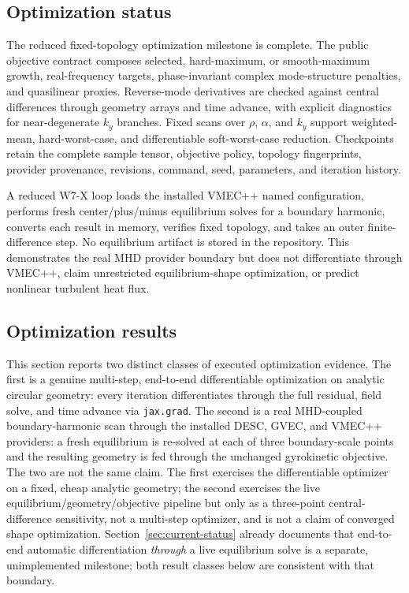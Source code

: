 \documentclass[11pt,a4paper]{article}
\begin{document}
\subsection{Optimization status}

The reduced fixed-topology optimization milestone is complete.  The public
objective contract composes selected, hard-maximum, or smooth-maximum growth,
real-frequency targets, phase-invariant complex mode-structure penalties, and
quasilinear proxies.  Reverse-mode derivatives are checked against central
differences through geometry arrays and time advance, with explicit diagnostics
for near-degenerate \(k_y\) branches.  Fixed scans over \(\rho\), \(\alpha\), and
\(k_y\) support weighted-mean, hard-worst-case, and differentiable
soft-worst-case reduction.  Checkpoints retain the complete sample tensor,
objective policy, topology fingerprints, provider provenance, revisions,
command, seed, parameters, and iteration history.

A reduced W7-X loop loads the installed VMEC++ named configuration, performs
fresh center/plus/minus equilibrium solves for a boundary harmonic, converts
each result in memory, verifies fixed topology, and takes an outer finite-
difference step.  No equilibrium artifact is stored in the repository.  This
demonstrates the real MHD provider boundary but does not differentiate through
VMEC++, claim unrestricted equilibrium-shape optimization, or predict nonlinear
turbulent heat flux.

\subsection{Optimization results}
\label{sec:optimization-results}

This section reports two distinct classes of executed optimization evidence.
The first is a genuine multi-step, end-to-end differentiable optimization on
analytic circular geometry: every iteration differentiates through the full
residual, field solve, and time advance via \texttt{jax.grad}.  The second is
a real MHD-coupled boundary-harmonic scan through the installed DESC, GVEC,
and VMEC++ providers: a fresh equilibrium is re-solved at each of three
boundary-scale points and the resulting geometry is fed through the unchanged
gyrokinetic objective.  The two are not the same claim.  The first exercises
the differentiable optimizer on a fixed, cheap analytic geometry; the second
exercises the live equilibrium/geometry/objective pipeline but only as a
three-point central-difference sensitivity, not a multi-step optimizer, and
is not a claim of converged shape optimization.  Section~\ref{sec:current-status}
already documents that end-to-end automatic differentiation \emph{through} a
live equilibrium solve is a separate, unimplemented milestone; both result
classes below are consistent with that boundary.
\end{document}
